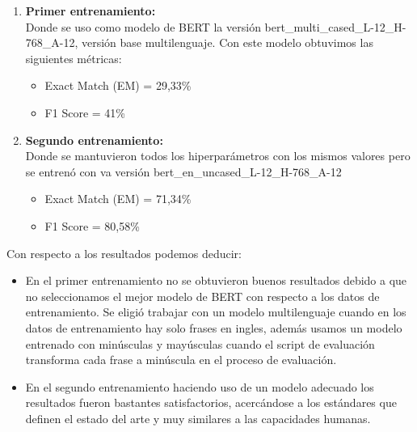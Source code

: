 \begin{enumerate}
    \item \textbf{Primer entrenamiento:} \\
    Donde se uso como modelo de BERT la versión bert\_multi\_cased\_L-12\_H-768\_A-12, versión base multilenguaje. Con este modelo obtuvimos las siguientes métricas:
    
    \begin{itemize}
        \item Exact Match (EM) = 29,33\%
        \item F1 Score =  41\%
    \end{itemize}
    
    \item \textbf{Segundo entrenamiento:} \\
    Donde se mantuvieron todos los hiperparámetros con los mismos valores pero se entrenó con va versión bert\_en\_uncased\_L-12\_H-768\_A-12 
    
    \begin{itemize}
        \item Exact Match (EM) = 71,34\%
        \item F1 Score =  80,58\%
    \end{itemize}
    
\end{enumerate}

Con respecto a los resultados podemos deducir:

\begin{itemize}
    \item En el primer entrenamiento no se obtuvieron buenos resultados debido a que no seleccionamos el mejor modelo de BERT con respecto a los datos de entrenamiento. Se eligió trabajar con un modelo multilenguaje cuando en los datos de entrenamiento hay solo frases en ingles, además usamos un modelo entrenado con minúsculas y mayúsculas cuando el script de evaluación transforma cada frase a minúscula en el proceso de evaluación.
    \item En el segundo entrenamiento haciendo uso de un modelo adecuado los resultados fueron bastantes satisfactorios, acercándose a los estándares que definen el estado del arte y muy similares a las capacidades humanas.
\end{itemize}
